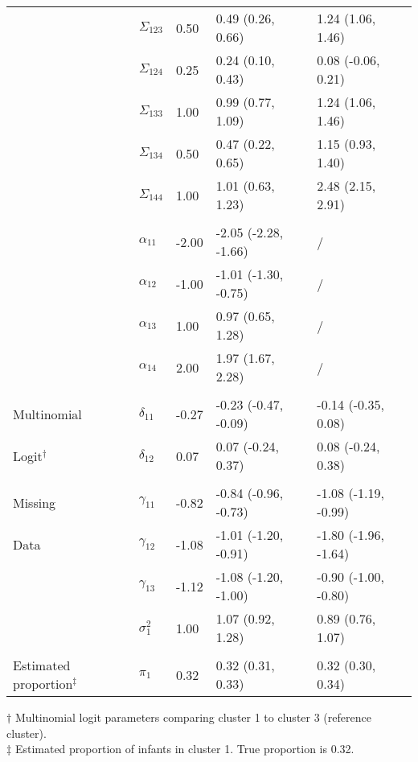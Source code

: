 \documentclass[useAMS,usenatbib,referee]{biom}
\begin{document}
\begin{table}[t]
\begin{center}
\begin{tabular}{lllll}
\hspace{1em} & $\Sigma_{123}$ & 0.50 & 0.49 (0.26, 0.66) & 1.24 (1.06, 1.46)\\
\hspace{1em} & $\Sigma_{124}$ & 0.25 & 0.24 (0.10, 0.43) & 0.08 (-0.06, 0.21) \\
\hspace{1em} & $\Sigma_{133}$ & 1.00 & 0.99 (0.77, 1.09) & 1.24 (1.06, 1.46)\\
\hspace{1em} & $\Sigma_{134}$ & 0.50 & 0.47 (0.22, 0.65) & 1.15 (0.93, 1.40) \\
\hspace{1em} & $\Sigma_{144}$ & 1.00 & 1.01 (0.63, 1.23) & 2.48 (2.15, 2.91)\\
\addlinespace[0.2em]
\multicolumn{5}{l}{\textbf{ }}\\
 & $\alpha_{11}$ & -2.00 & -2.05 (-2.28, -1.66) &     / \\
 & $\alpha_{12}$ & -1.00 & -1.01 (-1.30, -0.75)&     / \\
 & $\alpha_{13}$ & 1.00 & 0.97 (0.65, 1.28) &     / \\
 & $\alpha_{14}$ & 2.00 & 1.97 (1.67, 2.28) &     / \\
\addlinespace[0.2em]
\multicolumn{5}{l}{\textbf{ }}\\
Multinomial & $\delta_{11}$ & -0.27 & -0.23 (-0.47, -0.09) & -0.14 (-0.35, 0.08)\\
Logit$^{\dagger}$& $\delta_{12}$ & 0.07 & 0.07 (-0.24, 0.37) & 0.08 (-0.24, 0.38)\\
\addlinespace[0.2em]
\multicolumn{5}{l}{\textbf{ }}\\
Missing & $\gamma_{11}$ & -0.82 & -0.84 (-0.96, -0.73) & -1.08 (-1.19, -0.99) \\
Data& $\gamma_{12}$ & -1.08 & -1.01 (-1.20, -0.91) & -1.80 (-1.96, -1.64)\\
\hspace{1em} & $\gamma_{13}$ & -1.12 & -1.08 (-1.20, -1.00) & -0.90 (-1.00, -0.80)\\
\hspace{1em} & $\sigma^2_{1}$ & 1.00 & 1.07 (0.92, 1.28) & 0.89 (0.76, 1.07)\\
\addlinespace[0.2em]
\multicolumn{5}{l}{\textbf{ }}\\
Estimated proportion$^{\ddagger}$ & $\pi_1$ & 0.32 & 0.32 (0.31, 0.33) & 0.32 (0.30, 0.34)\\
\bottomrule
\end{tabular}\vspace{.75cm}
\end{center}
$\dagger$ Multinomial logit parameters comparing cluster 1 to cluster 3 (reference cluster).\\[4pt]
$\ddagger$ Estimated proportion of infants in cluster 1. True proportion is 0.32.
\end{table}
\end{document}
